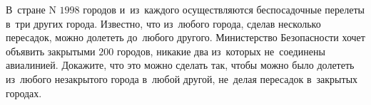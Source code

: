 \begin{problems}
\item
В~стране N $1998$ городов и~из~каждого осуществляются беспосадочные
перелеты в~три других города.
Известно, что из~любого города, сделав несколько пересадок, можно долететь
до~любого другого.
Министерство Безопасности хочет объявить закрытыми $200$ городов, никакие два
из~которых не~соединены авиалинией.
Докажите, что это можно сделать так, чтобы можно было долететь из~любого
незакрытого города в~любой другой, не~делая пересадок в~закрытых городах.

\end{problems}

